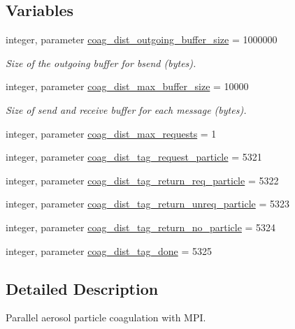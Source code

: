 \subsection*{Variables}
\begin{DoxyCompactItemize}
\item 
integer, parameter \mbox{\hyperlink{namespacepmc__coagulation__dist_abb819d699f6444884920ff2d74ec6029}{coag\+\_\+dist\+\_\+outgoing\+\_\+buffer\+\_\+size}} = 1000000
\begin{DoxyCompactList}\small\item\em Size of the outgoing buffer for {\ttfamily bsend} (bytes). \end{DoxyCompactList}\item 
integer, parameter \mbox{\hyperlink{namespacepmc__coagulation__dist_ab3e4473a732c373efcf8ab530122cae8}{coag\+\_\+dist\+\_\+max\+\_\+buffer\+\_\+size}} = 10000
\begin{DoxyCompactList}\small\item\em Size of send and receive buffer for each message (bytes). \end{DoxyCompactList}\item 
integer, parameter \mbox{\hyperlink{namespacepmc__coagulation__dist_ad7130affac816ec06993cec78d709373}{coag\+\_\+dist\+\_\+max\+\_\+requests}} = 1
\item 
integer, parameter \mbox{\hyperlink{namespacepmc__coagulation__dist_ab6b1e6f6a55e57f278333e999c39e410}{coag\+\_\+dist\+\_\+tag\+\_\+request\+\_\+particle}} = 5321
\item 
integer, parameter \mbox{\hyperlink{namespacepmc__coagulation__dist_abbe8d538b4d2ecf332192cee8127f15d}{coag\+\_\+dist\+\_\+tag\+\_\+return\+\_\+req\+\_\+particle}} = 5322
\item 
integer, parameter \mbox{\hyperlink{namespacepmc__coagulation__dist_aae979dd8e66e985362f2063f669f36dc}{coag\+\_\+dist\+\_\+tag\+\_\+return\+\_\+unreq\+\_\+particle}} = 5323
\item 
integer, parameter \mbox{\hyperlink{namespacepmc__coagulation__dist_a2d3fbb1c25d95ef5333fa20db3f5eaf0}{coag\+\_\+dist\+\_\+tag\+\_\+return\+\_\+no\+\_\+particle}} = 5324
\item 
integer, parameter \mbox{\hyperlink{namespacepmc__coagulation__dist_ae077b985386ed347d8b4f7791a9cbfcf}{coag\+\_\+dist\+\_\+tag\+\_\+done}} = 5325
\end{DoxyCompactItemize}


\subsection{Detailed Description}
Parallel aerosol particle coagulation with M\+PI. 

